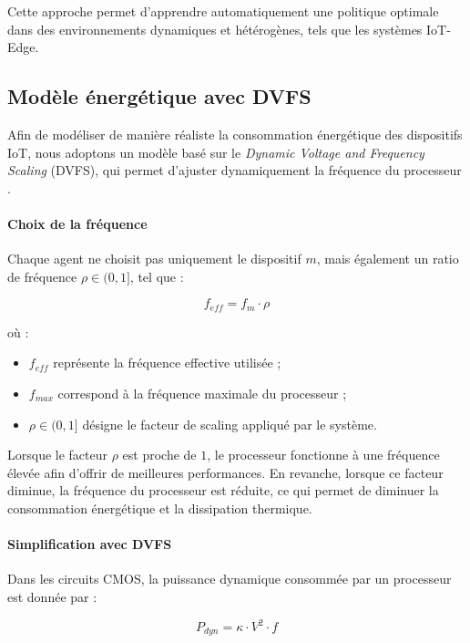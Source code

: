 \documentclass[12pt,a4paper]{report}
\begin{document}
Cette approche permet d’apprendre automatiquement une politique optimale dans des environnements dynamiques et hétérogènes, tels que les systèmes IoT-Edge.

\subsection{Modèle énergétique avec DVFS}

Afin de modéliser de manière réaliste la consommation énergétique des dispositifs IoT, nous adoptons un modèle basé sur le \textit{Dynamic Voltage and Frequency Scaling} (DVFS), qui permet d’ajuster dynamiquement la fréquence du processeur \cite{lesueur2010dvfs}.

\paragraph{Choix de la fréquence}

Chaque agent ne choisit pas uniquement le dispositif $m$, mais également un ratio de fréquence $\rho \in (0,1]$, tel que :

\begin{equation}
f_{eff} = f_m \cdot \rho
\end{equation}

où :
\begin{itemize}
    \item $f_{eff}$ représente la fréquence effective utilisée ;
    \item $f_{max}$ correspond à la fréquence maximale du processeur ;
    \item $\rho \in (0,1]$ désigne le facteur de scaling appliqué par le système.
\end{itemize}

Lorsque le facteur $\rho$ est proche de $1$, le processeur fonctionne à une fréquence élevée afin d’offrir de meilleures performances. En revanche, lorsque ce facteur diminue, la fréquence du processeur est réduite, ce qui permet de diminuer la consommation énergétique et la dissipation thermique.

\paragraph{Simplification avec DVFS}
Dans les circuits CMOS, la puissance dynamique consommée par un processeur est donnée par :

\begin{equation}
P_{dyn} = \kappa \cdot V^2 \cdot f
\end{equation}
\end{document}
